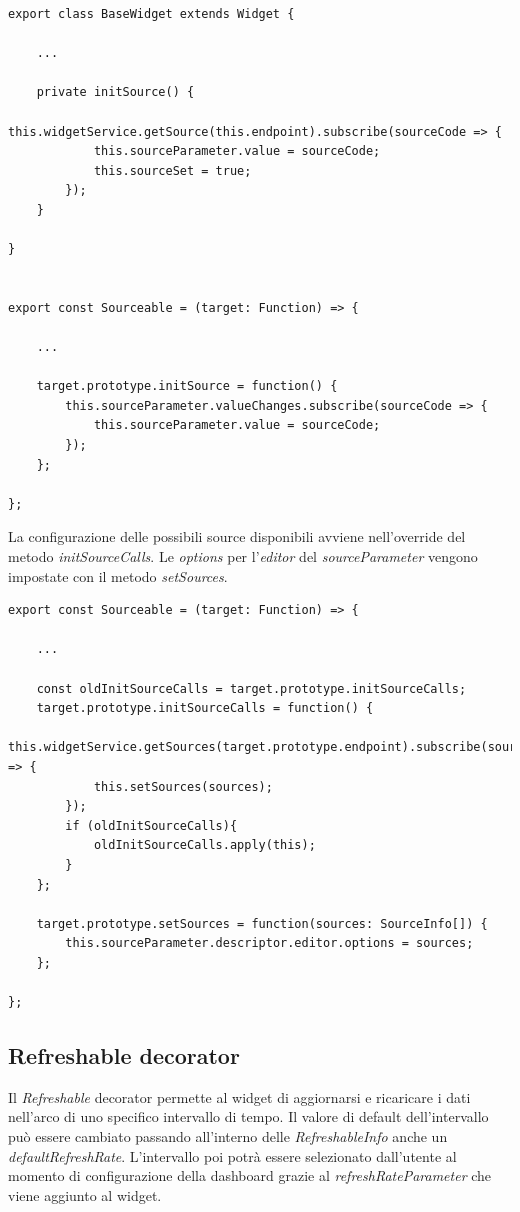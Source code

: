 \begin{lstlisting}[caption={Metodo initSource e override}, style=javaScriptCode]
export class BaseWidget extends Widget {
    
    ...
    
    private initSource() {
        this.widgetService.getSource(this.endpoint).subscribe(sourceCode => {
            this.sourceParameter.value = sourceCode;
            this.sourceSet = true;
        });
    }
    
}


export const Sourceable = (target: Function) => {

    ...

    target.prototype.initSource = function() {
        this.sourceParameter.valueChanges.subscribe(sourceCode => {
            this.sourceParameter.value = sourceCode;
        });
    };

};
\end{lstlisting}
La configurazione delle possibili source disponibili avviene nell'override del metodo \textit{initSourceCalls}. Le \textit{options} per l'\textit{editor} del \textit{sourceParameter} vengono impostate con il metodo \textit{setSources}.

\begin{lstlisting}[caption={Decorator Sourceable, metodi initSourceCalls e setSources e override}, style=javaScriptCode]
export const Sourceable = (target: Function) => {

    ...
    
    const oldInitSourceCalls = target.prototype.initSourceCalls;
    target.prototype.initSourceCalls = function() {
        this.widgetService.getSources(target.prototype.endpoint).subscribe(sources => {
            this.setSources(sources);
        });
        if (oldInitSourceCalls){
            oldInitSourceCalls.apply(this);
        }
    };

    target.prototype.setSources = function(sources: SourceInfo[]) {
        this.sourceParameter.descriptor.editor.options = sources;
    };

};
\end{lstlisting}
\subsection{Refreshable decorator}
Il \textit{Refreshable} decorator permette al widget di aggiornarsi e ricaricare i dati nell'arco di uno specifico intervallo di tempo. Il valore di default dell'intervallo può essere cambiato passando all'interno delle \textit{RefreshableInfo} anche un \textit{defaultRefreshRate}.
L'intervallo poi potrà essere selezionato dall'utente al momento di configurazione della dashboard grazie al \textit{refreshRateParameter} che viene aggiunto al widget.

